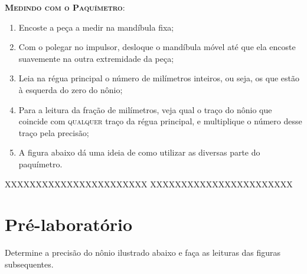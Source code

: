 \textsc{\textbf{Medindo com o Paquímetro}}:
\begin{enumerate}
\item Encoste a peça a medir na mandíbula fixa;
\item Com o polegar no impulsor, desloque o mandíbula móvel até que ela encoste suavemente na outra extremidade da peça;
\item Leia na régua principal o número de milímetros inteiros, ou seja, os que estão à esquerda do zero do nônio;
\item Para a leitura da fração de milímetros, veja qual o traço do nônio que coincide com \textsc{qualquer} traço da régua principal, e multiplique o número desse traço pela precisão;
\item A figura abaixo dá uma ideia de como utilizar as diversas parte do paquímetro.

\end{enumerate}

XXXXXXXXXXXXXXXXXXXXXXX
XXXXXXXXXXXXXXXXXXXXXXX

\section{Pré-laboratório}
Determine a precisão do nônio ilustrado abaixo e faça as leituras das figuras subsequentes.

\def\esqnonio{-0.1cm}
\def\largnonio{12*0.19cm}

